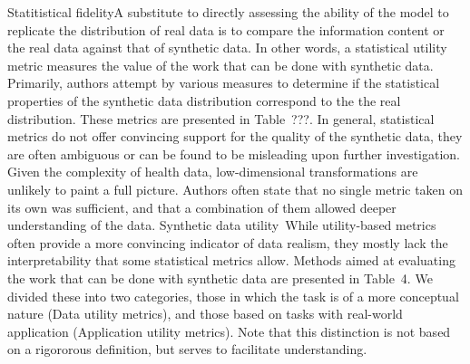 Statitistical fidelityA substitute to directly assessing the ability of the model to replicate the distribution of real data is to compare the information content or the real data against that of synthetic data. In other words, a statistical utility metric measures the value of the work that can be done with synthetic data. Primarily, authors attempt by various measures to determine if the statistical properties of the synthetic data distribution correspond to the the real distribution. These metrics are presented in Table ???. In general, statistical metrics do not offer convincing support for the quality of the synthetic data, they are often ambiguous or can be found to be misleading upon further investigation. Given the complexity of health data, low-dimensional transformations are unlikely to paint a full picture. Authors often state that no single metric taken on its own was sufficient, and that a combination of them allowed deeper understanding of the data. Synthetic data utility While utility-based metrics often provide a more convincing indicator of data realism, they mostly lack the interpretability that some statistical metrics allow. Methods aimed at evaluating the work that can be done with synthetic data are presented in Table 4. We divided these into two categories, those in which the task is of a more conceptual nature (Data utility metrics), and those based on tasks with real-world application (Application utility metrics). Note that this distinction is not based on a rigororous definition, but serves to facilitate understanding.

